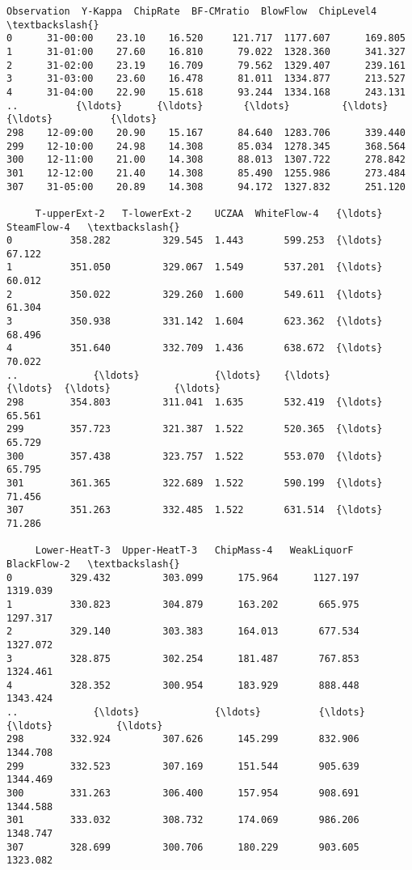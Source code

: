 \documentclass[11pt]{article}
\makeatletter
\newcommand{\boxspacing}{\kern\kvtcb@left@rule\kern\kvtcb@boxsep}
\newcommand{\prompt}[4]{
        {\ttfamily\llap{{\color{#2}[#3]:\hspace{3pt}#4}}\vspace{-\baselineskip}}
    }
\makeatother
\begin{document}
            \begin{tcolorbox}[breakable, size=fbox, boxrule=.5pt, pad at break*=1mm, opacityfill=0]
\prompt{Out}{outcolor}{16}{\boxspacing}
\begin{Verbatim}[commandchars=\\\{\}]
    Observation  Y-Kappa  ChipRate  BF-CMratio  BlowFlow  ChipLevel4   \textbackslash{}
0      31-00:00    23.10    16.520     121.717  1177.607      169.805
1      31-01:00    27.60    16.810      79.022  1328.360      341.327
2      31-02:00    23.19    16.709      79.562  1329.407      239.161
3      31-03:00    23.60    16.478      81.011  1334.877      213.527
4      31-04:00    22.90    15.618      93.244  1334.168      243.131
..          {\ldots}      {\ldots}       {\ldots}         {\ldots}       {\ldots}          {\ldots}
298    12-09:00    20.90    15.167      84.640  1283.706      339.440
299    12-10:00    24.98    14.308      85.034  1278.345      368.564
300    12-11:00    21.00    14.308      88.013  1307.722      278.842
301    12-12:00    21.40    14.308      85.490  1255.986      273.484
307    31-05:00    20.89    14.308      94.172  1327.832      251.120

     T-upperExt-2   T-lowerExt-2    UCZAA  WhiteFlow-4   {\ldots}  SteamFlow-4   \textbackslash{}
0          358.282         329.545  1.443       599.253  {\ldots}        67.122
1          351.050         329.067  1.549       537.201  {\ldots}        60.012
2          350.022         329.260  1.600       549.611  {\ldots}        61.304
3          350.938         331.142  1.604       623.362  {\ldots}        68.496
4          351.640         332.709  1.436       638.672  {\ldots}        70.022
..             {\ldots}             {\ldots}    {\ldots}           {\ldots}  {\ldots}           {\ldots}
298        354.803         311.041  1.635       532.419  {\ldots}        65.561
299        357.723         321.387  1.522       520.365  {\ldots}        65.729
300        357.438         323.757  1.522       553.070  {\ldots}        65.795
301        361.365         322.689  1.522       590.199  {\ldots}        71.456
307        351.263         332.485  1.522       631.514  {\ldots}        71.286

     Lower-HeatT-3  Upper-HeatT-3   ChipMass-4   WeakLiquorF   BlackFlow-2   \textbackslash{}
0          329.432         303.099      175.964      1127.197      1319.039
1          330.823         304.879      163.202       665.975      1297.317
2          329.140         303.383      164.013       677.534      1327.072
3          328.875         302.254      181.487       767.853      1324.461
4          328.352         300.954      183.929       888.448      1343.424
..             {\ldots}             {\ldots}          {\ldots}           {\ldots}           {\ldots}
298        332.924         307.626      145.299       832.906      1344.708
299        332.523         307.169      151.544       905.639      1344.469
300        331.263         306.400      157.954       908.691      1344.588
301        333.032         308.732      174.069       986.206      1348.747
307        328.699         300.706      180.229       903.605      1323.082


\end{Verbatim}
\end{tcolorbox}
\end{document}
